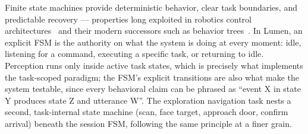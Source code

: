 Finite state machines provide deterministic behavior, clear task boundaries, and
predictable recovery --- properties long exploited in robotics control
architectures~\cite{brooks1986robust} and their modern successors such as behavior
trees~\cite{colledanchise2018behavior}. In Lumen, an explicit FSM is the authority on
what the system is doing at every moment: idle, listening for a command, executing a
specific task, or returning to idle. Perception runs only inside active task states,
which is precisely what implements the task-scoped paradigm; the FSM's explicit
transitions are also what make the system testable, since every behavioral claim can
be phrased as ``event X in state Y produces state Z and utterance W''. The
exploration navigation task nests a second, task-internal state machine (scan, face
target, approach door, confirm arrival) beneath the session FSM, following the same
principle at a finer grain.